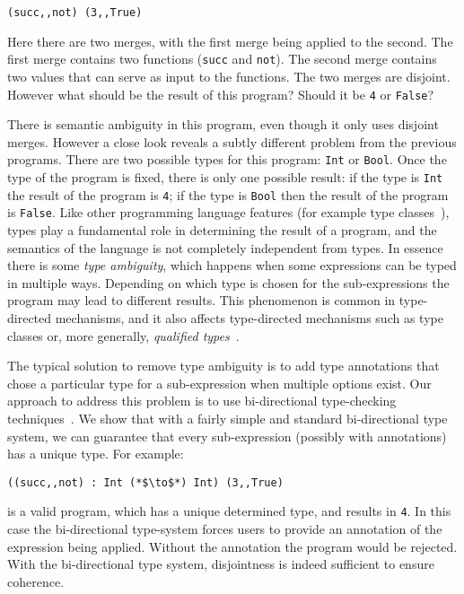 \begin{lstlisting}
(succ,,not) (3,,True)
\end{lstlisting}

\noindent Here there are two merges, with the first merge being applied to the second. 
The first merge contains two functions 
(\lstinline$succ$ and \lstinline$not$). The second merge contains two values 
that can serve as input to the functions. The two merges are disjoint. 
However what should be the result of this program? Should it be 
\lstinline$4$ or \lstinline$False$? %

There is semantic ambiguity in this program, even though it only uses
disjoint merges. However a close look reveals 
a subtly different problem from the previous programs. There are two possible 
types for this program: \lstinline{Int} or \lstinline{Bool}. Once the type 
of the program is fixed, there is only one possible result: if the type is 
\lstinline$Int$ the result of the program is \lstinline$4$; if the type 
is \lstinline$Bool$ then the result of the program is \lstinline$False$. 
Like other programming language features (for example type classes~\cite{Wadler89ad-hoc}), 
types play a fundamental role in determining the result of a program, and the 
semantics of the language is not completely independent from types. 
In essence there is some \emph{type ambiguity}, which happens 
when some expressions can 
be typed in multiple ways. Depending on which type is chosen 
for the sub-expressions the program may lead to different results. 
This phenomenon is common in type-directed mechanisms, and it also 
affects type-directed mechanisms such as type classes or, more
generally, \emph{qualified types}~\cite{Mark93coherence}.

The typical solution to remove type ambiguity is to add type
annotations that chose a particular type for a sub-expression when
multiple options exist. Our approach to address this problem is to 
use bi-directional type-checking techniques~\cite{Pierce00local,Dunfield04tri}. We show that 
with a fairly simple and standard bi-directional type system, we can guarantee 
that every sub-expression (possibly with annotations) has a unique
type. For example:

\begin{lstlisting}
((succ,,not) : Int (*$\to$*) Int) (3,,True)
\end{lstlisting}

\noindent is a valid \name program, which has a unique determined type, and results in
\lstinline$4$. In this case the bi-directional type-system 
forces users to provide an annotation of the expression being applied.
Without the annotation the program would be rejected. With the
bi-directional type system, disjointness is indeed sufficient to ensure coherence. 


